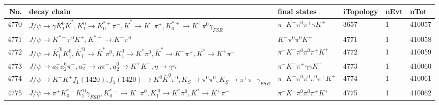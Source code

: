 \begin{table}[htbp] 
\begin{center}
\begin{small}
\begin{tabular}{rlllll}\hline\hline
 No. & decay chain & final states &  iTopology & nEvt & nTot \\\hline
4770&$J/\psi       \rightarrow \gamma       K_1^{0}        \bar{K}^{*}   , K_1^{0}         \rightarrow K_{0}^{*+}     \pi^{-}        , \bar{K}^{*}    \rightarrow K^{-}          \pi^{+}        , K_{0}^{*+}      \rightarrow K^{+}          \pi^{0}        \gamma_{FSR} $&$\pi^{-}        K^{-}          \pi^{0}        \pi^{+}        \gamma       K^{+}          $& 3657&    1&410057\\
4771&$J/\psi       \rightarrow K^{*-}         \pi^{0}        K^{+}          , K^{*-}          \rightarrow K^{-}          \pi^{0}        $&$K^{-}          \pi^{0}        \pi^{0}        K^{+}          $& 4771&    1&410058\\
4772&$J/\psi       \rightarrow \bar{K}_1^{'0}K_1^{0}        , \bar{K}_1^{'0} \rightarrow \bar{K}^{*}   \pi^{0}        , K_1^{0}         \rightarrow K^{*}          \pi^{0}        , \bar{K}^{*}    \rightarrow K^{-}          \pi^{+}        , K^{*}           \rightarrow K^{+}          \pi^{-}        $&$\pi^{-}        K^{-}          \pi^{0}        \pi^{0}        \pi^{+}        K^{+}          $& 4772&    1&410059\\
4773&$J/\psi       \rightarrow a_{2}^{-}      a_{2}^{0}      \pi^{+}        , a_{2}^{-}       \rightarrow \eta          \pi^{-}        , a_{2}^{0}       \rightarrow K^{+}          K^{-}          , \eta           \rightarrow \gamma       \gamma       $&$\pi^{-}        K^{-}          \pi^{+}        \gamma       \gamma       K^{+}          $& 4773&    1&410060\\
4774&$J/\psi       \rightarrow K^{-}          K^{+}          f_{1}(1420)    , f_{1}(1420)     \rightarrow K^{0}          \bar{K}^{0}   \pi^{0}        , K_{S}           \rightarrow \pi^{0}        \pi^{0}        , K_{S}           \rightarrow \pi^{+}        \pi^{-}        \gamma_{FSR} $&$\pi^{-}        K^{-}          \pi^{0}        \pi^{0}        \pi^{0}        \pi^{+}        K^{+}          $& 4774&    1&410061\\
4775&$J/\psi       \rightarrow \pi^{+}        K_{0}^{*-}     K_1^{'0}      \gamma_{FSR} , K_{0}^{*-}      \rightarrow K^{-}          \pi^{0}        , K_1^{'0}       \rightarrow K^{*}          \pi^{0}        , K^{*}           \rightarrow K^{+}          \pi^{-}        $&$\pi^{-}        K^{-}          \pi^{0}        \pi^{0}        \pi^{+}        K^{+}          $& 4775&    1&410062\\

\end{tabular}
\end{small}
\end{center}
\end{table}
